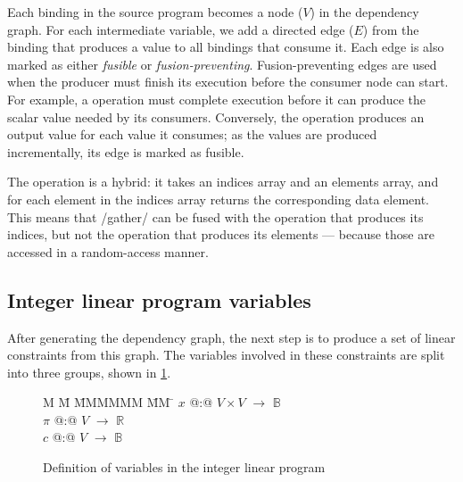 

Each binding in the source program becomes a node ($V$) in the dependency graph.
For each intermediate variable, we add a directed edge ($E$) from the binding that produces a value to all bindings that consume it.
Each edge is also marked as either \emph{fusible} or \emph{fusion-preventing}.
Fusion-preventing edges are used when the producer must finish its execution before the consumer node can start.
For example, a \Hs@fold@ operation must complete execution before it can produce the scalar value needed by its consumers.
Conversely, the \Hs@map@ operation produces an output value for each value it consumes; as the values are produced incrementally, its edge is marked as fusible. 

The \Hs@gather@ operation is a hybrid: it takes an indices array and an elements array, and for each element in the indices array returns the corresponding data element.
This means that \Hs/gather/ can be fused with the operation that produces its indices, but not the operation that produces its elements --- because those are accessed in a random-access manner. 




\subsection{Integer linear program variables}
After generating the dependency graph, the next step is to produce a set of linear constraints from this graph.
The variables involved in these constraints are split into three groups, shown in \cref{fig:clustering:ilp-vars}.

\begin{figure}
\centering
\parbox{0cm}{
\begin{tabbing}
M   \= M \= MMMMMM \= MM \= \kill
$x$   \> @:@  \> $V \times V$ \> $\to$ \> $\mathbb{B}$ \\
$\pi$ \> @:@  \> $V$             \> $\to$ \> $\mathbb{R}$ \\
$c$   \> @:@  \> $V$             \> $\to$ \> $\mathbb{B}$
\end{tabbing}
}
\caption{Definition of variables in the integer linear program}
\label{fig:clustering:ilp-vars}
\end{figure}

